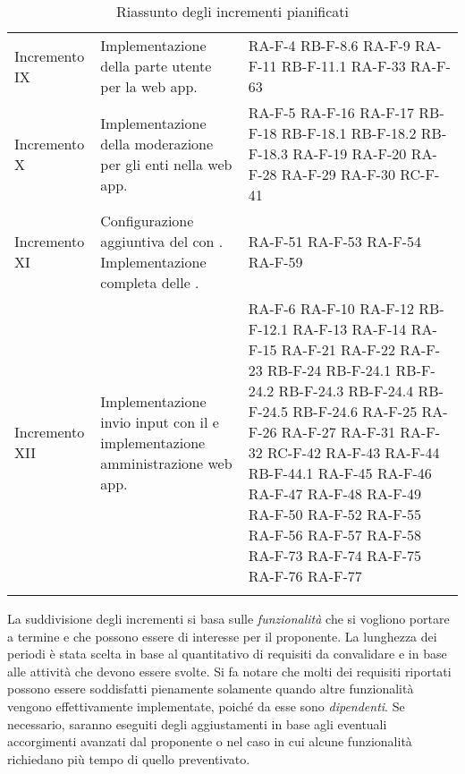 \begin{center}
\begin{longtable}{|p{2.5cm}|p{6.5cm}|p{6cm}|}
	\hline
	\rowcolor{lighter-grayer} \multicolumn{3}{|c|}{\textbf{Completamento dell'implementazione e raffinamento delle funzionalità}} \\ \hline 
	Incremento IX	& Implementazione della parte utente per la web app. & RA-F-4 RB-F-8.6 RA-F-9 RA-F-11 RB-F-11.1 RA-F-33 RA-F-63 \\	\hline
	Incremento X	& Implementazione della moderazione per gli enti nella web app. & RA-F-5 RA-F-16 RA-F-17 RB-F-18 RB-F-18.1 RB-F-18.2 RB-F-18.3 RA-F-19 RA-F-20 RA-F-28 RA-F-29 RA-F-30  RC-F-41 \\	\hline
	Incremento XI   & Configurazione aggiuntiva del \glock{gateway} con \glock{Kafka}. Implementazione completa delle \glock{API}. & RA-F-51 RA-F-53 RA-F-54 RA-F-59 \\ \hline
	Incremento XII	& Implementazione invio input con il \glock{bot Telegram} e implementazione amministrazione web app. & RA-F-6 RA-F-10 RA-F-12 RB-F-12.1 RA-F-13 RA-F-14 RA-F-15 RA-F-21 RA-F-22 RA-F-23 RB-F-24 RB-F-24.1 RB-F-24.2 RB-F-24.3 RB-F-24.4 RB-F-24.5 RB-F-24.6 RA-F-25 RA-F-26 RA-F-27 RA-F-31 RA-F-32 RC-F-42 RA-F-43 RA-F-44 RB-F-44.1 RA-F-45 RA-F-46 RA-F-47 RA-F-48 RA-F-49 RA-F-50 RA-F-52 RA-F-55 RA-F-56 RA-F-57 RA-F-58 RA-F-73 RA-F-74 RA-F-75 RA-F-76 RA-F-77 \\	\hline
	\caption{Riassunto degli incrementi pianificati}
	\end{longtable}
\end{center}
La suddivisione degli incrementi si basa sulle \textit{funzionalità} che si vogliono portare a termine e che possono essere di interesse per il proponente. La lunghezza dei periodi è stata scelta in base al quantitativo di requisiti da convalidare e in base alle attività che devono essere svolte. Si fa notare che molti dei requisiti riportati possono essere soddisfatti pienamente solamente quando altre funzionalità vengono effettivamente implementate, poiché da esse sono \textit{dipendenti}. 
\newline 
Se necessario, saranno eseguiti degli aggiustamenti in base agli eventuali accorgimenti avanzati dal proponente o nel caso in cui alcune funzionalità richiedano più tempo di quello preventivato.